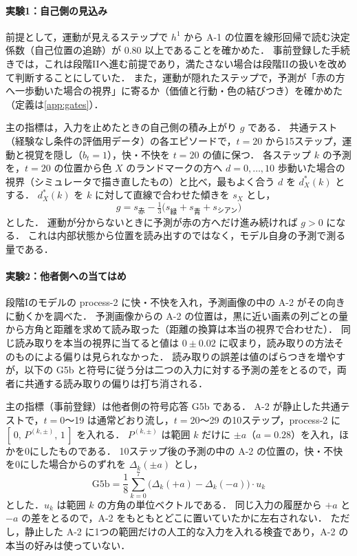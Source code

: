 \paragraph{実験1：自己側の見込み}
前提として，運動が見えるステップで $h^1$ から A-1 の位置を線形回帰で読む決定係数（自己位置の追跡）が 0.80 以上であることを確かめた．
事前登録した手続きでは，これは段階IIへ進む前提であり，満たさない場合は段階IIの扱いを改めて判断することにしていた．
また，運動が隠れたステップで，予測が「赤の方へ一歩動いた場合の視界」に寄るか（価値と行動・色の結びつき）を確かめた（定義は\ref{app:gates}）．

主の指標は，入力を止めたときの自己側の積み上がり $g$ である．
共通テスト（経験なし条件の評価用データ）の各エピソードで，$t=20$ から15ステップ，運動と視覚を隠し（$b_t=1$），快・不快を $t=20$ の値に保つ．
各ステップ $k$ の予測を，$t=20$ の位置から色 $X$ のランドマークの方へ $d=0,\dots,10$ 歩動いた場合の視界（シミュレータで描き直したもの）と比べ，最もよく合う $d$ を $d^{*}_{X}(k)$ とする．
$d^{*}_{X}(k)$ を $k$ に対して直線で合わせた傾きを $s_X$ とし，
\begin{equation}
  g = s_{\text{赤}} - \tfrac{1}{3}\bigl(s_{\text{緑}} + s_{\text{青}} + s_{\text{シアン}}\bigr)
\end{equation}
とした．
運動が分からないときに予測が赤の方へだけ進み続ければ $g>0$ になる．
これは内部状態から位置を読み出すのではなく，モデル自身の予測で測る量である．

\paragraph{実験2：他者側への当てはめ}
段階Iのモデルの process-2 に快・不快を入れ，予測画像の中の A-2 がその向きに動くかを調べた．
予測画像からの A-2 の位置は，黒に近い画素の列ごとの量から方角と距離を求めて読み取った（距離の換算は本当の視界で合わせた）．
同じ読み取りを本当の視界に当てると値は $0\pm0.02$ に収まり，読み取りの方法そのものによる偏りは見られなかった．
読み取りの誤差は値のばらつきを増やすが，以下の G5b と符号に従う分は二つの入力に対する予測の差をとるので，両者に共通する読み取りの偏りは打ち消される．

主の指標（事前登録）は他者側の符号応答 G5b である．
A-2 が静止した共通テストで，$t=0$〜19 は通常どおり流し，$t=20$〜29 の10ステップ，process-2 に $[\,0,\,P^{(k,\pm)},\,1\,]$ を入れる．
$P^{(k,\pm)}$ は範囲 $k$ だけに $\pm a$（$a=0.28$）を入れ，ほかを0にしたものである．
10ステップ後の予測の中の A-2 の位置の，快・不快を0にした場合からのずれを $\Delta_k(\pm a)$ とし，
\begin{equation}
  \mathrm{G5b} = \frac{1}{8}\sum_{k=0}^{7} \bigl(\Delta_k(+a) - \Delta_k(-a)\bigr)\cdot u_k
\end{equation}
とした．$u_k$ は範囲 $k$ の方角の単位ベクトルである．
同じ入力の履歴から $+a$ と $-a$ の差をとるので，A-2 をもともとどこに置いていたかに左右されない．
ただし，静止した A-2 に1つの範囲だけの人工的な入力を入れる検査であり，A-2 の本当の好みは使っていない．


